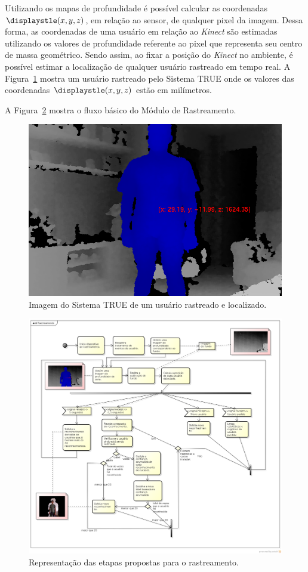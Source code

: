 	Utilizando os mapas de profundidade é possível calcular as coordenadas$\displaystle (x,y,z)$, em relação ao sensor, de qualquer pixel da imagem. Dessa forma, as coordenadas de uma usuário em relação ao \textit{Kinect} são estimadas utilizando os valores de profundidade referente ao pixel que representa seu centro de massa geométrico. Sendo assim, ao fixar a posição do \textit{Kinect} no ambiente, é possível estimar a localização de qualquer usuário rastreado em tempo real. A Figura~\ref{fig:localizacao} mostra um usuário rastreado pelo Sistema TRUE onde os valores das coordenadas $\displaystle (x,y,z)$ estão em milímetros.

	A Figura~\ref{fig:processo-rastreamento} mostra o fluxo básico do Módulo de Rastreamento.

	\begin{figure}[H]
		\begin{center}
			\includegraphics[scale=0.45]{figuras/4.ProblemaEProposta/localizacao.png}
		\end{center}
		\caption{Imagem do Sistema TRUE de um usuário rastreado e localizado.}
		\label{fig:localizacao}
	\end{figure}
	
	
	\begin{figure}[H]
		\begin{center}
			\includegraphics[scale=0.40]{figuras/4.ProblemaEProposta/diagrama-rastreamento.png}
		\end{center}
		\caption{Representação das etapas propostas para o rastreamento.}
		\label{fig:processo-rastreamento}
	\end{figure}
